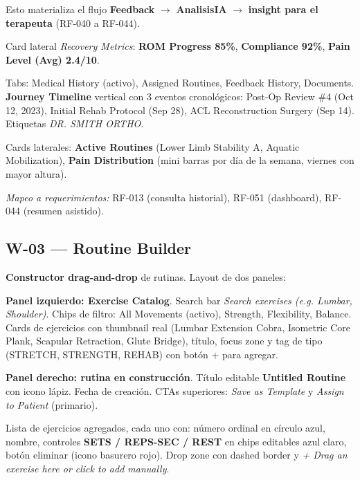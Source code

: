 Esto materializa el flujo \textbf{Feedback} $\rightarrow$ \textbf{AnalisisIA} $\rightarrow$ \textbf{insight para el terapeuta} (RF-040 a RF-044).

Card lateral \textit{Recovery Metrics}: \textbf{ROM Progress 85\%}, \textbf{Compliance 92\%}, \textbf{Pain Level (Avg) 2.4/10}.

Tabs: Medical History (activo), Assigned Routines, Feedback History, Documents. \textbf{Journey Timeline} vertical con 3 eventos cronológicos: Post-Op Review \#4 (Oct 12, 2023), Initial Rehab Protocol (Sep 28), ACL Reconstruction Surgery (Sep 14). Etiquetas \textit{DR. SMITH ORTHO}.

Cards laterales: \textbf{Active Routines} (Lower Limb Stability A, Aquatic Mobilization), \textbf{Pain Distribution} (mini barras por día de la semana, viernes con mayor altura).

\textit{Mapeo a requerimientos:} RF-013 (consulta historial), RF-051 (dashboard), RF-044 (resumen asistido).


\subsection{W-03 --- Routine Builder}

\textbf{Constructor drag-and-drop} de rutinas. Layout de dos paneles:

\textbf{Panel izquierdo: Exercise Catalog}. Search bar \textit{Search exercises (e.g. Lumbar, Shoulder)}. Chips de filtro: All Movements (activo), Strength, Flexibility, Balance. Cards de ejercicios con thumbnail real (Lumbar Extension Cobra, Isometric Core Plank, Scapular Retraction, Glute Bridge), título, focus zone y tag de tipo (STRETCH, STRENGTH, REHAB) con botón + para agregar.

\textbf{Panel derecho: rutina en construcción}. Título editable \textbf{Untitled Routine} con icono lápiz. Fecha de creación. CTAs superiores: \textit{Save as Template} y \textit{Assign to Patient} (primario).

Lista de ejercicios agregados, cada uno con: número ordinal en círculo azul, nombre, controles \textbf{SETS / REPS-SEC / REST} en chips editables azul claro, botón eliminar (icono basurero rojo). Drop zone con dashed border y \textit{+ Drag an exercise here or click to add manually}.


